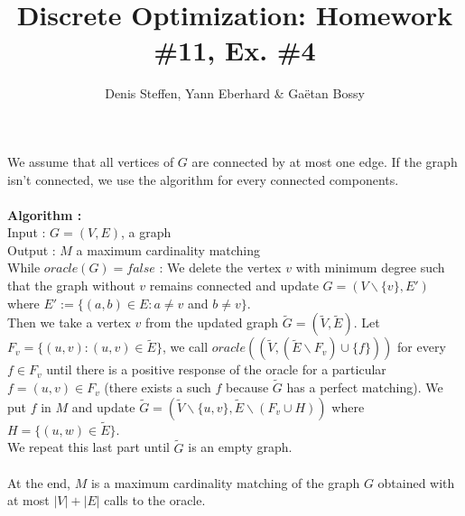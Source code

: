 \documentclass[a4paper,11pt,french]{article}
\title{Discrete Optimization: Homework \#11, Ex. \#4}
\author{Denis Steffen, Yann Eberhard \& Gaëtan Bossy}
\begin{document}
    
    \maketitle

    We assume that all vertices of $G$ are connected by at most one edge.  If the graph isn't connected, we use the algorithm for every connected components.\\\\
    
    
    \textbf{Algorithm :} \\
    Input : $G=(V,E)$, a graph \\
     Output : $M$ a maximum cardinality matching\\
    
    
    
    While $oracle(G)=false$ : We delete the vertex $v$ with minimum degree such that the graph without $v$ remains connected and update $G=(V\backslash{\{v\}},E')$ where $E' := \{(a,b) \in E : a\neq  v$ and $b \neq v \}$.\\
    
    
   Then we take a vertex $v$ from the updated graph $\widetilde{G}=(\widetilde{V},\widetilde{E})$. Let $F_{v}=\{(u,v) : (u,v) \in \widetilde{E}\}$, we call $oracle( (\widetilde{V},(\widetilde{E}\backslash F_{v} ) \cup \{f\}))$ for every $f \in F_{v}$ until there is a positive response of the oracle for a particular $f=(u,v) \in F_{v}$ (there exists a such $f$ because $\widetilde{G}$ has a perfect matching). We put $f$ in $M$ and update $\widetilde{G}=(\widetilde{V}\backslash \{u,v\},\widetilde{E}\backslash (F_{v} \cup H))$ where $H=\{(u,w) \in \widetilde{E}\}$. \\
   We repeat this last part until $\widetilde{G}$ is an empty graph. \\\\ 
 
At the end, $M$ is a maximum cardinality matching of the graph $G$ obtained with at most $|V|+|E|$ calls to the oracle.
  
\end{document}
